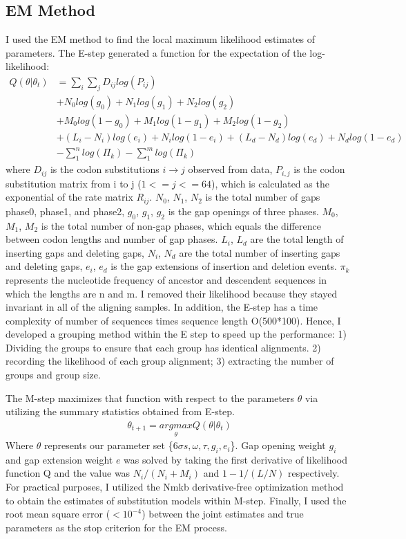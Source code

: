 \subsection{EM Method}
I used the EM method to find the local maximum likelihood estimates of parameters. The E-step generated a function for the expectation of the log-likelihood: 
\begin{equation}
\label{Ziqi_LL}
\begin{split}
Q(\theta|\theta_{t}) 
 &= \sum_{i}\sum_{j} D_{ij}log(P_{ij})\\
 &+ N_0log(g_0) + N_1log(g_1) + N_2log(g_2) \\
 &+ M_0log(1-g_0) + M_1log(1-g_1) + M_2log(1-g_2) \\
 &+ (L_i - N_i)log(e_i) + N_{i}log(1-e_i) +  (L_d - N_d)log(e_d) + N_{d}log(1-e_d)\\
 &- \sum_{1}^n log(\Pi_{k}) - \sum_{1}^m log(\Pi_{k})
 \end{split}
\end{equation}
where $D_{ij}$ is the codon substitutions $i \rightarrow j$ observed from data, $P_{i,j}$ is the codon substitution matrix from i to j ($1 <= j <= 64$), which is calculated as the exponential of the rate matrix $R_{ij}$. $N_0$, $N_1$, $N_2$ is the total number of gaps phase0, phase1, and phase2, $g_0$, $g_1$, $g_2$ is the gap openings of three phases. $M_0$, $M_1$, $M_2$ is the total number of non-gap phases, which equals the difference between codon lengths and number of gap phases. $L_i$, $L_d$ are the total length of inserting gaps and deleting gaps, $N_i$, $N_d$ are the total number of inserting gaps and deleting gaps, $e_i$, $e_d$ is the gap extensions of insertion and deletion events. $\pi_k$ represents the nucleotide frequency of ancestor and descendent sequences in which the lengths are n and m. I removed their likelihood because they stayed invariant in all of the aligning samples. In addition, the E-step has a time complexity of number of sequences times sequence length O(500*100). Hence, I developed a grouping method within the E step to speed up the performance: 1) Dividing the groups to ensure that each group has identical alignments. 2) recording the likelihood of each group alignment; 3) extracting the number of groups and group size. 

The M-step maximizes that function with respect to the parameters $\theta$ via utilizing the summary statistics obtained from E-step. 
\begin{gather*}
              \theta_{t+1} = \underset{\theta}{argmax}Q(\theta |\theta_{t})
\end{gather*}
Where $\theta$ represents our parameter set \{$6\sigma s, \omega,\tau, g_i,e_i$\}. Gap opening weight $g_i$ and gap extension weight $e$ was solved by taking the first derivative of likelihood function Q and the value was $N_i/(N_i+M_i)$ and $1-1/(L/N)$ respectively. For practical purposes, I utilized the Nmkb derivative-free optimization method to obtain the estimates of substitution models within M-step. Finally, I used the root mean square error ($<10^{-4}$) between the joint estimates and true parameters as the stop criterion for the EM process.    

